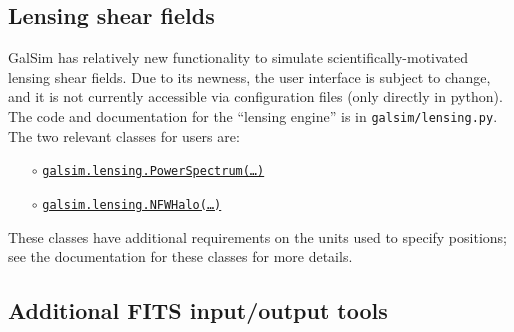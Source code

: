 \documentclass[preprint,11pt]{aastex}
\begin{document}
\subsection{Lensing shear fields}\label{sect:lensing}

GalSim has relatively new functionality to simulate scientifically-motivated
lensing shear fields. Due to its newness, the user interface is subject to
change, and it is not currently accessible via configuration files (only
directly in python).  The code and documentation for the ``lensing engine'' is
in {\tt galsim/lensing.py}.  The two relevant classes for users are:

\begin{itemize}
\item[$\circ$]
  \href{http://galsim-developers.github.com/GalSim/classgalsim_1_1lensing_1_1_power_spectrum.html}{\texttt{galsim.lensing.PowerSpectrum(\dots)}}

\item[$\circ$]
  \href{http://galsim-developers.github.com/GalSim/classgalsim_1_1lensing_1_1_n_f_w_halo.html}{\texttt{galsim.lensing.NFWHalo(\dots)}}
\end{itemize}

These classes have additional requirements on the units used to specify
positions; see the documentation for these classes for more details.

\subsection{Additional FITS input/output tools}\label{sect:multifits}
\end{document}

